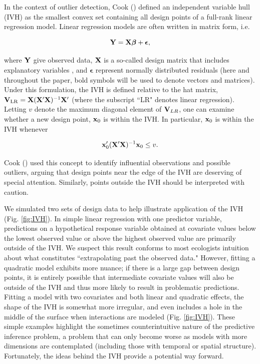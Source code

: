 \documentclass[12pt,english]{article}
\begin{document}
\begin{spacing}{1.9}
In the context of outlier detection, Cook (\citeyear{Cook1979}) defined an independent variable hull (IVH) as the smallest convex set containing all design points of a full-rank linear regression model.  Linear regression models are often written in matrix form, i.e.
\begin{linenomath*}
\begin{equation*}
  {\bf Y} = {\bf X} \boldsymbol{\beta} + \boldsymbol{\epsilon},
\end{equation*}
\end{linenomath*}
where ${\bf Y}$ give observed data, ${\bf X}$ is a so-called design matrix that includes explanatory variables \citep[see e.g.][]{Draper1966}, and $\boldsymbol{\epsilon}$ represent normally distributed residuals (here and throughout the paper, bold symbols will be used to denote vectors and matrices).
Under this formulation, the IVH is defined relative to the hat matrix, ${\bf V}_{\rm LR}={\bf X}({\bf X}^\prime{\bf X})^{-1}{\bf X}^\prime$ (where the subscript ``LR" denotes linear regression).  Letting $v$ denote the maximum diagonal element of ${\bf V}_{LR}$, one can examine whether a new design point, ${\bf x}_0$ is within the IVH.  In particular, ${\bf x}_0$ is within the IVH whenever
\begin{linenomath*}
\begin{equation}
  \label{eq:IVH}
  {\bf x}_0^\prime ({\bf X}^\prime{\bf X})^{-1}{\bf x}_0 \le v.
\end{equation}
\end{linenomath*}
Cook (\citeyear{Cook1979}) used this concept to identify influential observations and possible outliers, arguing that design points near the edge of the IVH are deserving of special attention.  Similarly, points outside the IVH should be interpreted with caution.

We simulated two sets of design data to help illustrate application of the IVH (Fig. \ref{fig:IVH}).  In simple linear regression with one predictor variable, predictions on a hypothetical response variable obtained at covariate values below the lowest observed value or above the highest observed value are primarily outside of the IVH.  We suspect this result conforms to most ecologists intuition about what constitutes ``extrapolating past the observed data."  However, fitting a quadratic model exhibits more nuance; if there is a large gap between design points, it is entirely possible that intermediate covariate values will also be outside of the IVH and thus more likely to result in problematic predictions.  Fitting a model with two covariates and both linear and quadratic effects, the shape of the IVH is somewhat more irregular, and even includes a hole in the middle of the surface when interactions are modeled (Fig. \ref{fig:IVH}).  These simple examples highlight the sometimes counterintuitive nature of the predictive inference problem, a problem that can only become worse as models with more dimensions are contemplated (including those with temporal or spatial structure).  Fortunately, the ideas behind the IVH provide a potential way forward.


\end{spacing}
\end{document}
